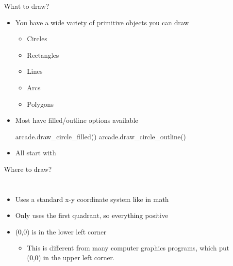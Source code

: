 \documentclass[pdf, aspectratio=169, 12pt]{beamer}
\begin{document}
\begin{frame}[fragile]{What to draw?}
	\begin{itemize}
		\item You have a wide variety of primitive objects you can draw
			\begin{itemize}
				\item Circles
				\item Rectangles
				\item Lines
				\item Arcs
				\item Polygons
			\end{itemize}
		\item Most have filled/outline options available
			\begin{pythoncode}
				arcade.draw_circle_filled()
				arcade.draw_circle_outline()
			\end{pythoncode}
		\item All start with 
	\end{itemize}
\end{frame}

\begin{frame}{Where to draw?}
	\begin{columns}
		\begin{itemize}
			\item Uses a standard x-y coordinate system like in math
			\item Only uses the first quadrant, so everything positive
			\item (0,0) is in the lower left corner
				\begin{itemize}
					\item This is different from many computer graphics programs, which put (0,0) in the upper left corner.
				\end{itemize}
		\end{itemize}
		\begin{center}
		\end{center}
	\end{columns}
\end{frame}
\end{document}
